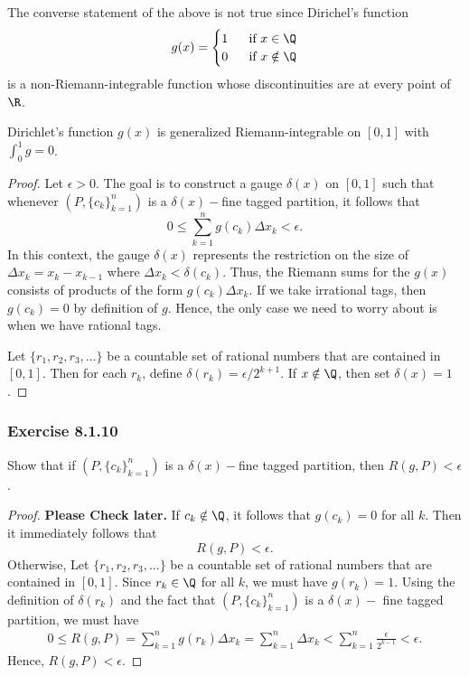 The converse statement of the above is not true since Dirichel's function 
\[  g(x) = 
\begin{cases}
    1 \ &\text{ if } x \in \Q \\
    0 \ &\text{ if } x \notin \Q 
\end{cases} \]
is a non-Riemann-integrable function whose discontinuities are at every point of \( \R  \).

\begin{tcolorbox}
\begin{thm}
    Dirichlet's function \( g(x)  \) is generalized Riemann-integrable on \( [0,1]  \) with \( \int_{ 0 }^{ 1 } g = 0  \).
\end{thm}
\end{tcolorbox}

\begin{proof}
    Let \( \epsilon > 0  \). The goal is to construct a gauge \( \delta(x)  \) on \( [0,1]  \) such that whenever \( (P, \{ c_{k }  \}_{k=1}^{n}  ) \) is a \( \delta(x)- \)fine tagged partition, it follows that 
    \[  0 \leq \sum_{ k=1 }^{ n } g(c_{k }) \Delta x_{k} < \epsilon. \]
    In this context, the gauge \( \delta(x)  \) represents the restriction on the size of \( \Delta x_{k } = x_{k } - x_{k-1} \) where \( \Delta x_{k } < \delta(c_{k }) \). Thus, the Riemann sums for the \( g(x) \) consists of products of the form \( g(c_{k }) \Delta x_{k } \). If we take irrational tags, then \( g(c_{k}) = 0  \) by definition of \( g  \). Hence, the only case we need to worry about is when we have rational tags.

    Let \( \{ r_{1}, r_{2},  r_{3}, \dots \}  \) be a countable set of rational numbers that are contained in \( [0,1]  \). Then for each \( r_{k }  \), define \( \delta(r_{k }) = \epsilon / 2^{k+1} \). If \( x \notin \Q  \), then set \( \delta(x) = 1  \).
\end{proof}

\subsubsection{Exercise 8.1.10} Show that if \( (P, \{ c_{k } \}_{k=1}^n ) \) is a \( \delta(x)- \)fine tagged partition, then \( R(g,P) < \epsilon \).
\begin{proof}
    \textbf{Please Check later.} If \( c_{k } \notin \Q  \), it follows that \( g(c_{k}) = 0  \) for all \( k  \). Then it immediately follows that 
    \[  R(g,P) < \epsilon. \] 
    Otherwise, Let \( \{ r_{1}, r_{2}, r_{3}, \dots  \}  \) be a countable set of rational numbers that are contained in \( [0,1]  \). Since \( r_{k } \in \Q \) for all \( k  \), we must have \( g(r_{k }) = 1  \). Using the definition of \( \delta(r_{k })  \) and the fact that \( (P, \{ c_{k } \}_{k=1}^n)  \) is a \( \delta(x)-\) fine tagged partition, we must have 
    \begin{align*}
       0 \leq R(g, P)  = \sum_{ k=1 }^{n } g(r_{k }) \Delta x_{k }
                = \sum_{ k=1 }^{ n } \Delta x_{k } 
                < \sum_{ k=1 }^{ n } \frac{ \epsilon  }{ 2^{k-1} }  
                < \epsilon.
    \end{align*}
    Hence, \( R(g,P) < \epsilon. \)
\end{proof}


